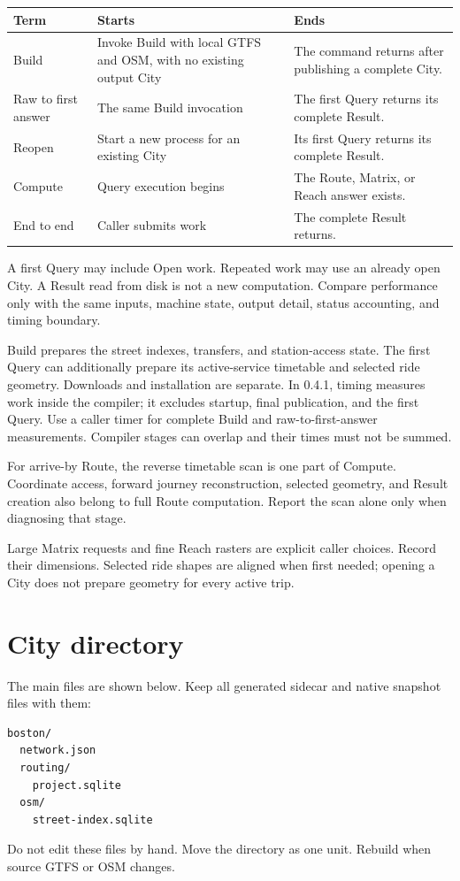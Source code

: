 \documentclass[10pt,letterpaper]{article}
\begin{document}
\begin{center}
\begin{tabularx}{\linewidth}{P{1.05in} Y Y}
\toprule
\textbf{Term} & \textbf{Starts} & \textbf{Ends} \\
\midrule
Build & Invoke Build with local GTFS and OSM, with no existing output City & The command returns after publishing a complete City. \\
Raw to first answer & The same Build invocation & The first Query returns its complete Result. \\
Reopen & Start a new process for an existing City & Its first Query returns its complete Result. \\
Compute & Query execution begins & The Route, Matrix, or Reach answer exists. \\
End to end & Caller submits work & The complete Result returns. \\
\bottomrule
\end{tabularx}
\end{center}

A first Query may include Open work. Repeated work may use an already open City. A Result read from disk is not a new computation. Compare performance only with the same inputs, machine state, output detail, status accounting, and timing boundary.

Build prepares the street indexes, transfers, and station-access state. The first Query can additionally prepare its active-service timetable and selected ride geometry. Downloads and installation are separate. In 0.4.1,  timing  measures work inside the compiler; it excludes startup, final publication, and the first Query. Use a caller timer for complete Build and raw-to-first-answer measurements. Compiler stages can overlap and their times must not be summed.

For arrive-by Route, the reverse timetable scan is one part of Compute. Coordinate access, forward journey reconstruction, selected geometry, and Result creation also belong to full Route computation. Report the scan alone only when diagnosing that stage.

Large Matrix requests and fine Reach rasters are explicit caller choices. Record their dimensions. Selected ride shapes are aligned when first needed; opening a City does not prepare geometry for every active trip.

\section{City directory}

The main files are shown below. Keep all generated sidecar and native snapshot files with them:

\begin{lstlisting}
boston/
  network.json
  routing/
    project.sqlite
  osm/
    street-index.sqlite
\end{lstlisting}

Do not edit these files by hand. Move the directory as one unit. Rebuild when source GTFS or OSM changes.
\end{document}
